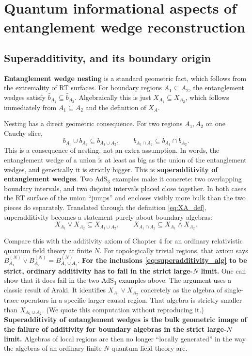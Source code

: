\section{Quantum informational aspects of entanglement wedge reconstruction}

\subsection*{Superadditivity, and its boundary origin}

\textbf{Entanglement wedge nesting} is a standard geometric fact, which follows from the extremality of RT
surfaces. For boundary regions $A_1\subseteq A_2$, the entanglement wedges satisfy
$\widehat b_{A_1}\subseteq\widehat b_{A_2}$. Algebraically this is just $X_{A_1}\subseteq X_{A_2}$, which
follows immediately from $A_1\subseteq A_2$ and the definition of $X_A$.

Nesting has a direct geometric consequence. For two regions $A_1,A_2$ on one Cauchy slice,
\[
b_{A_1}\cup b_{A_2} \subseteq b_{A_1\cup A_2}, \qquad b_{A_1\cap A_2}\subseteq b_{A_1}\cap b_{A_2} .
\]
This is a consequence of nesting, not an extra assumption. In words, the entanglement wedge of a union is at
least as big as the union of the entanglement wedges, and generically it is strictly bigger. This is
\textbf{superadditivity of entanglement wedges}. Two AdS$_3$ examples make it concrete: two overlapping
boundary intervals, and two disjoint intervals placed close together. In both cases the RT surface of the
union ``jumps'' and encloses visibly more bulk than the two pieces do separately. Translated through the
definition \eqref{eq:XA_def}, superadditivity becomes a statement purely about boundary algebras:
\begin{equation}
X_{A_1}\vee X_{A_2} \subseteq X_{A_1\cup A_2}, \qquad X_{A_1\cap A_2}\subseteq X_{A_1}\wedge X_{A_2} .
\label{eq:superadditivity_alg}
\end{equation}

Compare this with the additivity axiom of Chapter 4 for an ordinary relativistic quantum field theory at
finite $N$. For topologically trivial regions, that axiom says $B_{A_1}^{(N)}\vee B_{A_2}^{(N)}
=B_{A_1\cup A_2}^{(N)}$. \textbf{For the inclusions \eqref{eq:superadditivity_alg} to be strict, ordinary
additivity has to fail in the strict large-$N$ limit.} One can show that it does fail in the two AdS$_3$
examples above. The argument uses a classic result of Araki. It identifies $X_{A_1}\vee X_{A_2}$ concretely as
the algebra of single-trace operators in a specific larger causal region. That algebra is strictly smaller
than $X_{A_1\cup A_2}$. (We quote this computation without reproducing it.) \textbf{Superadditivity of
entanglement wedges is the bulk geometric image of the failure of additivity for boundary algebras in the
strict large-$N$ limit.} Algebras of local regions are then no longer ``locally generated'' in the way the
algebras of an ordinary finite-$N$ quantum field theory are.


